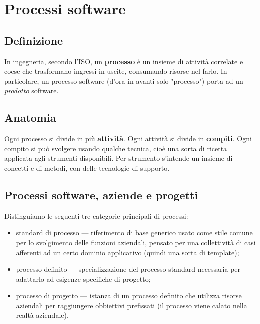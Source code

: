 \documentclass[a4paper]{article}
\begin{document}
		
	\section{Processi software}


		
	\subsection{Definizione}

		
In ingegneria, secondo l'ISO, un \textbf{processo} è un insieme di attività correlate e coese che trasformano ingressi in uscite, consumando risorse nel farlo. In particolare, un processo software (d'ora in avanti solo "processo") porta ad un \emph{prodotto} software.

		
	\subsection{Anatomia}

		
Ogni processo si divide in più \textbf{attività}. Ogni attività si divide in \textbf{compiti}. Ogni compito si può svolgere usando qualche tecnica, cioè una sorta di ricetta applicata agli strumenti disponibili. Per strumento s'intende un insieme di concetti e di metodi, con delle tecnologie di supporto.

		
	\subsection{Processi software, aziende e progetti}

		
Distinguiamo le seguenti tre categorie principali di processi:
		
	\begin{itemize}
		
			
	\item standard di processo — riferimento di base generico usato come stile comune per lo svolgimento delle funzioni aziendali, pensato per una collettività di casi afferenti ad un certo dominio applicativo (quindi una sorta di template); %

			
	\item processo definito — specializzazione del processo standard necessaria per adattarlo ad esigenze specifiche di progetto;
			
	\item processo di progetto — istanza di un processo definito che utilizza risorse aziendali per raggiungere obbiettivi prefissati (il processo viene calato nella realtà aziendale).
		
	\end{itemize}
\end{document}
